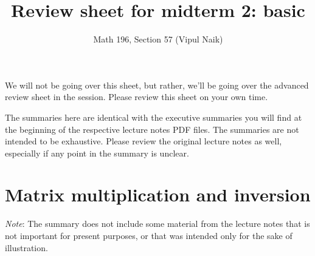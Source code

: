 \documentclass[10pt]{amsart}
\title{Review sheet for midterm 2: basic}
\author{Math 196, Section 57 (Vipul Naik)}
\begin{document}
\maketitle

We will not be going over this sheet, but rather, we'll be going over
the advanced review sheet in the session. Please review this sheet on
your own time.

The summaries here are identical with the executive summaries you will
find at the beginning of the respective lecture notes PDF files. The
summaries are not intended to be exhaustive. Please review the
original lecture notes as well, especially if any point in the summary
is unclear.

\section{Matrix multiplication and inversion}

{\em Note}: The summary does not include some material from the
lecture notes that is not important for present purposes, or that was
intended only for the sake of illustration.
\end{document}
